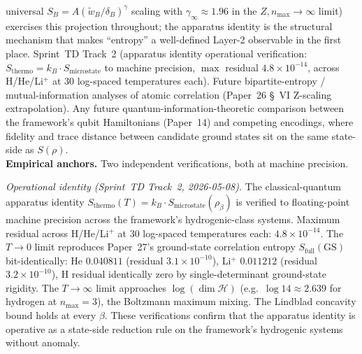 universal $S_B = A(\tilde{w}_B/\delta_B)^\gamma$ scaling with
$\gamma_\infty \approx 1.96$ in the $Z, n_{\max} \to \infty$ limit)
exercises this projection throughout; the apparatus identity is the
structural mechanism that makes ``entropy'' a well-defined Layer-2
observable in the first place.  Sprint~TD Track~2 (apparatus identity
operational verification: $S_\mathrm{thermo} = k_B \cdot
S_\mathrm{microstate}$ to machine precision, $\max$ residual
$4.8\times 10^{-14}$, across H/He/Li$^+$ at $30$ log-spaced
temperatures each).  Future bipartite-entropy / mutual-information
analyses of atomic correlation (Paper~26 \S~VI Z-scaling
extrapolation).  Any future quantum-information-theoretic comparison
between the framework's qubit Hamiltonians (Paper~14) and competing
encodings, where fidelity and trace distance between candidate ground
states sit on the same state-side as $S(\rho)$.\\
\textbf{Empirical anchors.}  Two independent verifications, both at
machine precision.
\smallskip

\textit{Operational identity (Sprint~TD Track~2, 2026-05-08).}  The
classical-quantum apparatus identity $S_\mathrm{thermo}(T) = k_B \cdot
S_\mathrm{microstate}(\rho_\beta)$ is verified to floating-point
machine precision across the framework's hydrogenic-class systems.
Maximum residual across H/He/Li$^+$ at $30$ log-spaced temperatures
each: $4.8 \times 10^{-14}$.  The $T \to 0$ limit reproduces
Paper~27's ground-state correlation entropy $S_\mathrm{full}(\mathrm{GS})$
bit-identically: He $0.040811$ (residual $3.1\times 10^{-10}$),
Li$^+$ $0.011212$ (residual $3.2\times 10^{-10}$), H residual
identically zero by single-determinant ground-state rigidity.  The
$T \to \infty$ limit approaches $\log(\dim \mathcal{H})$ (e.g.\ $\log
14 \approx 2.639$ for hydrogen at $n_{\max}=3$), the Boltzmann maximum
mixing.  The Lindblad concavity bound holds at every $\beta$.  These
verifications confirm that the apparatus identity is operative as a
state-side reduction rule on the framework's hydrogenic systems
without anomaly.
\smallskip

